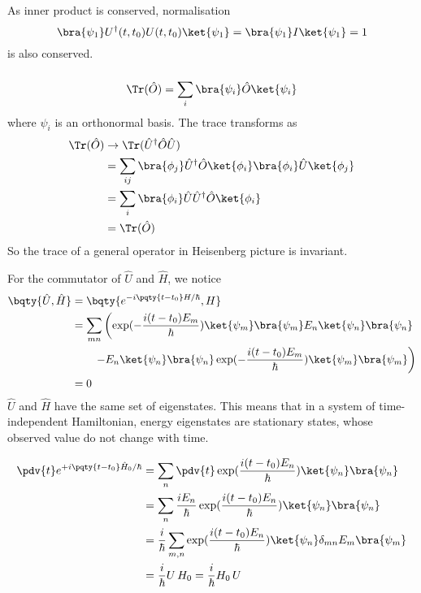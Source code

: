 \documentclass[12pt]{article}
\begin{document}
\subsubsection{} As inner product is conserved, normalisation \[
    \bra{\psi_1}U^\dagger (t,t_0)U(t,t_0)\ket{\psi_1} =
    \bra{\psi_1}I\ket{\psi_1} = 1
\]
is also conserved.
\subsubsection{} { \begin{equation*}
    \Tr(\hat{O}) = \sum_i \bra{\psi_i} \hat{O} \ket{\psi_i} 
\end{equation*}}
where \(\psi_i\) is an orthonormal basis. The trace transforms as
\begin{align*}
    \Tr(\hat{O}) &\to \Tr(\hat{U}^\dagger \hat{O} \hat{U})\\
    &=  \sum_{ij}\bra{\phi_j} \hat{U}^\dagger \hat{O} \ket{\phi_i}  \bra{\phi_i} \hat{U} \ket{\phi_j} \\
    &=  \sum_{i}\bra{\phi_i} \hat{U} \hat{U}^\dagger \hat{O} \ket{\phi_i} \\
    &= \Tr(\hat{O})
\end{align*}
So the trace of a general operator in Heisenberg picture is invariant.

For the commutator of \(\hat{U}\) and \(\hat{H}\), we notice \begin{align*}
   \bqty{\hat{U},\hat{H}} &=\bqty{ e^{ -i\pqty{t - t_0}H/\hbar},H}\\
   &= \sum_{mn}\left(\exp( - \frac{i(t - t_0)E_m}{\hbar})\ket{\psi_m} \bra{\psi_m} E_n \ket{\psi_n} \bra{\psi_n} \right.\\
   &\qquad\left.- E_n \ket{\psi_n} \bra{\psi_n} \exp( - \frac{i(t - t_0)E_m}{\hbar})\ket{\psi_m} \bra{\psi_m}\right) \\
   &=0
\end{align*}
\(\hat{U}\) and \(\hat{H}\) have the same set of eigenstates. This means that in a system of time-independent Hamiltonian, energy eigenstates are stationary states, whose observed value do not change with time.

\begin{align*}
    \pdv{t} e^{ +i\pqty{t - t_0}\hat{H}_0/\hbar} &= \sum_n \pdv{t} \exp(\frac{i(t - t_0)E_n}{\hbar}) \ket{\psi_n} \bra{\psi_n}\\ 
    &= \sum_n \frac{iE_n}{\hbar} \exp(\frac{i(t - t_0)E_n}{\hbar}) \ket{\psi_n} \bra{\psi_n}\\ 
    &= \frac{i}{\hbar}\sum_{m, n} \exp(\frac{i(t - t_0)E_n}{\hbar}) \ket{\psi_n} \delta_{mn} E_m \bra{\psi_m} \\
    &= \frac{i}{\hbar}U\, H_0 =\frac{i}{\hbar}H_0\, U
\end{align*}
\end{document}
